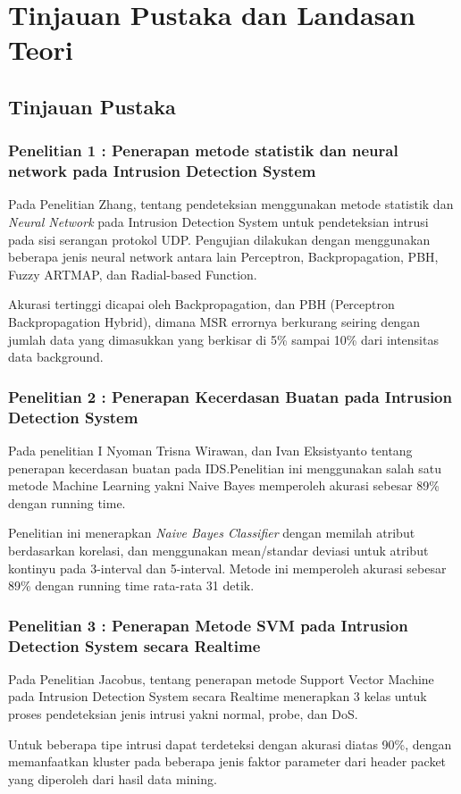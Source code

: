 \documentclass[./skripsi.tex]{subfiles}
\begin{document}
\chapter{Tinjauan Pustaka dan Landasan Teori}
\section{Tinjauan Pustaka}
\subsection{Penelitian 1 : Penerapan metode statistik dan neural network pada Intrusion Detection System}
\par Pada Penelitian Zhang, tentang pendeteksian menggunakan metode statistik dan  \textit{Neural Network} pada Intrusion Detection System untuk pendeteksian intrusi pada sisi serangan protokol UDP. Pengujian dilakukan dengan menggunakan beberapa jenis neural network antara lain Perceptron, Backpropagation, PBH, Fuzzy ARTMAP, dan Radial-based Function.
\par Akurasi tertinggi dicapai oleh Backpropagation, dan PBH (Perceptron Backpropagation Hybrid), dimana MSR errornya berkurang seiring dengan jumlah data yang dimasukkan yang berkisar di 5\% sampai 10\% dari intensitas data background.\cite{zhang2001hide}
\subsection{Penelitian 2 : Penerapan Kecerdasan Buatan pada Intrusion Detection System}
\par Pada penelitian I Nyoman Trisna Wirawan, dan Ivan Eksistyanto tentang penerapan kecerdasan buatan pada IDS.Penelitian ini menggunakan salah satu metode Machine Learning yakni Naive Bayes memperoleh akurasi sebesar 89\% dengan running time. 
\par Penelitian ini menerapkan \textit{Naive Bayes Classifier} dengan memilah atribut berdasarkan korelasi, dan menggunakan mean/standar deviasi untuk atribut kontinyu pada 3-interval dan 5-interval. Metode ini memperoleh akurasi sebesar 89\% dengan running time rata-rata 31 detik. \cite{wirawan2015penerapan}
\subsection{Penelitian 3 : Penerapan Metode SVM pada Intrusion Detection System secara Realtime}
\par Pada Penelitian Jacobus, tentang penerapan metode Support Vector Machine pada Intrusion Detection System secara Realtime menerapkan 3 kelas untuk proses pendeteksian jenis intrusi yakni normal, probe, dan DoS.
\par Untuk beberapa tipe intrusi dapat terdeteksi dengan akurasi diatas 90\%, dengan memanfaatkan kluster pada beberapa jenis faktor parameter dari header packet yang diperoleh dari hasil data mining. \cite{jacobus2014penerapan}
\end{document}
